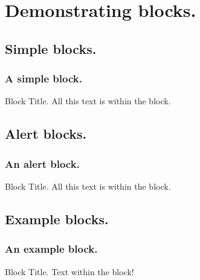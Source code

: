 \documentclass[12pt]{beamer}            %
\begin{document}
\section{Demonstrating blocks.}
\subsection{Simple blocks.}
\begin{frame}
    \frametitle{A simple block.}
    \begin{block}{Block Title.}
        All this text is within the block.
    \end{block}
\end{frame}

\subsection{Alert blocks.}
\begin{frame}
    \frametitle{An alert block.}
    \begin{alertblock}{Block Title.}
        All this text is within the block.
    \end{alertblock}
\end{frame}

\subsection{Example blocks.}
\begin{frame}
    \frametitle{An example block.}
    \begin{exampleblock}{Block Title.}
        Text within the block!
    \end{exampleblock}
\end{frame}

\end{document}
